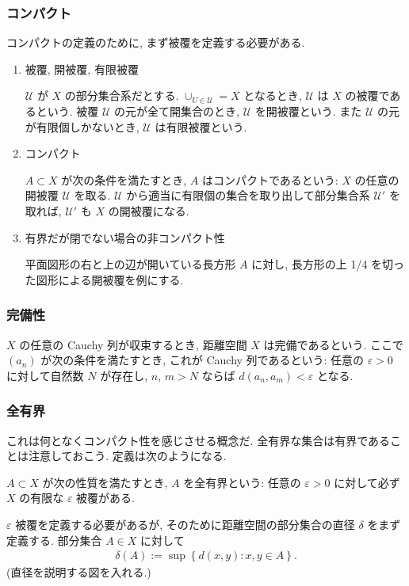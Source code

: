 \documentclass[openany, a4paper, oneside]{jsbook}
\begin{document}
\subsubsection{コンパクト}

コンパクトの定義のために, まず被覆を定義する必要がある.
\begin{enumerate}
\item 被覆, 開被覆, 有限被覆

$\mathcal{U}$ が $X$ の部分集合系だとする.
$\cup_{U \in \mathcal{U}} = X$ となるとき, $\mathcal{U}$ は $X$ の被覆であるという.
被覆 $\mathcal{U}$ の元が全て開集合のとき, $\mathcal{U}$ を開被覆という.
また $\mathcal{U}$ の元が有限個しかないとき, $\mathcal{U}$ は有限被覆という.
\item コンパクト

$A \subset X$ が次の条件を満たすとき, $A$ はコンパクトであるという:
$X$ の任意の開被覆 $\mathcal{U}$ を取る.
$\mathcal{U}$ から適当に有限個の集合を取り出して部分集合系 $\mathcal{U}'$ を取れば,
$\mathcal{U}'$ も $X$ の開被覆になる.
\item 有界だが閉でない場合の非コンパクト性

平面図形の右と上の辺が開いている長方形 $A$ に対し, 長方形の上 1/4 を切った図形による開被覆を例にする.
\end{enumerate}
\subsubsection{完備性}

$X$ の任意の Cauchy 列が収束するとき, 距離空間 $X$ は完備であるという.
ここで $\left ( a_n \right)$ が次の条件を満たすとき, これが Cauchy 列であるという:
任意の $\varepsilon > 0$ に対して自然数 $N$ が存在し, $n$, $m > N$ ならば $d (a_n, a_m) < \varepsilon$ となる.
\subsubsection{全有界}

これは何となくコンパクト性を感じさせる概念だ.
全有界な集合は有界であることは注意しておこう.
定義は次のようになる.

$A \subset X$ が次の性質を満たすとき, $A$ を全有界という:
任意の $\varepsilon > 0$ に対して必ず $X$ の有限な $\varepsilon$ 被覆がある.

$\varepsilon$ 被覆を定義する必要があるが, そのために距離空間の部分集合の直径 $\delta$ をまず定義する.
部分集合 $A \in X$ に対して
\begin{align}
 \delta (A)
 :=
 \sup \left\{ d (x, y) : x, y \in A \right\}.
\end{align}
(直径を説明する図を入れる.)
\end{document}
